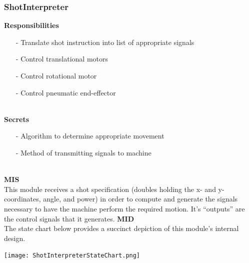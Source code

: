 \documentclass[titlepage]{article}
\begin{document}
\subsubsection{ShotInterpreter}
\textbf{Responsibilities}
\begin{itemize}
	\item[-] Translate shot instruction into list of appropriate signals
	\item[-] Control translational motors
	\item[-] Control rotational motor
	\item[-] Control pneumatic end-effector
\end{itemize}~\\
\textbf{Secrets}
\begin{itemize}
	\item[-] Algorithm to determine appropriate movement
	\item[-] Method of transmitting signals to machine
\end{itemize}~\\
\textbf{MIS}\\[2mm]
This module receives a shot specification (doubles holding the x- and y-coordinates, angle, and power) in order to compute and generate the signals necessary to have the machine perform the required motion. It's ``outputs'' are the control signals that it generates.
\newpage
\textbf{MID}\\[2mm]
The state chart below provides a succinct depiction of this module's internal design.\\
\begin{center}
	\texttt{[image: ShotInterpreterStateChart.png]}
\label{fig:ShotInterpreterStateChart}
\end{center}~\\
\end{document}
